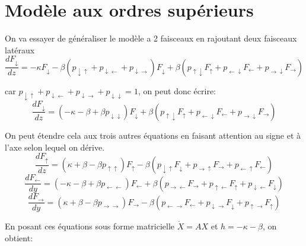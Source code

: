 \documentclass[12pt]{article}
\begin{document}
\section{Modèle aux ordres supérieurs}
On va essayer de généraliser le modèle a 2 faisceaux en rajoutant deux faisceaux latéraux %
\begin{equation}
    \frac{dF_{\downarrow}}{dz}=-\kappa F_{\downarrow}-\beta (p_{{\downarrow}{\uparrow}}+p_{{\downarrow}{\leftarrow}}+p_{{\downarrow}{\rightarrow}})F_{\downarrow} + \beta( p_{{\uparrow}{\downarrow}}F_{\uparrow}+p_{{\leftarrow}{\downarrow}}F_{\leftarrow}+p_{{\rightarrow}{\downarrow}}F_{\rightarrow})
\end{equation} \par car $p_{{\downarrow}{\uparrow}}+p_{{\downarrow}{\leftarrow}}+p_{{\downarrow}{\rightarrow}}+p_{{\downarrow}{\downarrow}}=1$, on peut donc écrire:
\begin{equation}
    \frac{dF_{\downarrow}}{dz}=(-\kappa -\beta +\beta p_{{\downarrow}{\downarrow}})F_{\downarrow}+ \beta( p_{{\uparrow}{\downarrow}}F_{\uparrow}+p_{{\leftarrow}{\downarrow}}F_{\leftarrow}+p_{{\rightarrow}{\downarrow}}F_{\rightarrow})   
\end{equation}\par
On peut étendre cela aux trois autres équations en faisant attention au signe et à l'axe selon lequel on dérive.
\begin{equation}
    \frac{dF_{\uparrow}}{dz}=(\kappa +\beta -\beta p_{{\uparrow}{\uparrow}})F_{\uparrow}- \beta( p_{{\downarrow}{\uparrow}}F_{\downarrow}+p_{{\rightarrow}{\uparrow}}F_{\rightarrow}+p_{{\leftarrow}{\uparrow}}F_{\leftarrow})
\end{equation}
\begin{equation}
    \frac{dF_{\leftarrow}}{dy}=(-\kappa -\beta +\beta p_{{\leftarrow}{\leftarrow}})F_{\leftarrow}+ \beta( p_{{\rightarrow}{\leftarrow}}F_{\rightarrow}+p_{{\uparrow}{\leftarrow}}F_{\uparrow}+p_{{\downarrow}{\leftarrow}}F_{\downarrow})
\end{equation}
\begin{equation}
    \frac{dF_{\rightarrow}}{dy}=(\kappa +\beta -\beta p_{{\rightarrow}{\rightarrow}})F_{\rightarrow}- \beta( p_{{\leftarrow}{\rightarrow}}F_{\leftarrow}+p_{{\downarrow}{\rightarrow}}F_{\downarrow}+p_{{\uparrow}{\rightarrow}}F_{\uparrow})
\end{equation}\par
En posant ces équations sous forme matricielle $\dot{X}=AX$ et $h=-\kappa -\beta$, on obtient:
\end{document}
